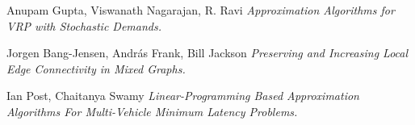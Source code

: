 \documentclass{article}
\theoremstyle{plain}
\theoremstyle{plain}
\begin{document}
\begin{thebibliography}{9}

Anupam Gupta, Viswanath Nagarajan, R. Ravi
\textit{Approximation Algorithms for VRP with Stochastic Demands.}

Jorgen Bang-Jensen, Andr\'{a}s Frank, Bill Jackson
\textit{Preserving and Increasing Local Edge Connectivity in Mixed Graphs.}

Ian Post, Chaitanya Swamy
\textit{Linear-Programming Based Approximation Algorithms For Multi-Vehicle Minimum Latency Problems.}

\end{thebibliography}
\end{document}
